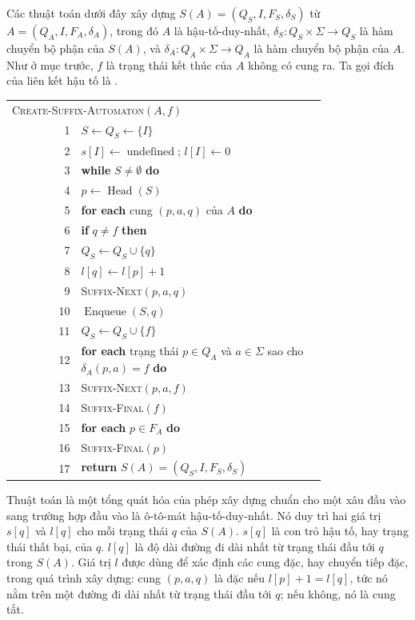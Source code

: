 \documentclass[11pt]{article}
\newcommand{\undefinedsym}{\operatorname{undefined}}
\begin{document}
Các thuật toán dưới đây xây dựng $S(A)=(Q_S,I,F_S,\delta_S)$ từ
$A=(Q_A,I,F_A,\delta_A)$, trong đó $A$ là hậu-tố-duy-nhất,
$\delta_S:Q_S\times\Sigma\to Q_S$ là hàm chuyển bộ phận của $S(A)$, và
$\delta_A:Q_A\times\Sigma\to Q_A$ là hàm chuyển bộ phận của $A$. Như ở mục
trước, $f$ là trạng thái kết thúc của $A$ không có cung ra. Ta gọi đích của
liên kết hậu tố là .

\begin{center}
\begin{tabular}{r p{0.78\linewidth}}
\multicolumn{2}{l}{\textsc{Create-Suffix-Automaton}$(A,f)$}\\
1 & $S\leftarrow Q_S\leftarrow\{I\}$ \\
2 & $s[I]\leftarrow\undefinedsym$; $l[I]\leftarrow 0$\\
3 & \textbf{while} $S\ne\emptyset$ \textbf{do}\\
4 & \quad $p\leftarrow \operatorname{Head}(S)$\\
5 & \quad \textbf{for each} cung $(p,a,q)$ của $A$ \textbf{do}\\
6 & \quad\quad \textbf{if} $q\ne f$ \textbf{then}\\
7 & \quad\quad\quad $Q_S\leftarrow Q_S\cup\{q\}$\\
8 & \quad\quad\quad $l[q]\leftarrow l[p]+1$\\
9 & \quad\quad\quad \textsc{Suffix-Next}$(p,a,q)$\\
10 & \quad\quad\quad $\operatorname{Enqueue}(S,q)$\\
11 & $Q_S\leftarrow Q_S\cup\{f\}$\\
12 & \textbf{for each} trạng thái $p\in Q_A$ và $a\in\Sigma$ sao cho
      $\delta_A(p,a)=f$ \textbf{do}\\
13 & \quad \textsc{Suffix-Next}$(p,a,f)$\\
14 & \quad \textsc{Suffix-Final}$(f)$\\
15 & \textbf{for each} $p\in F_A$ \textbf{do}\\
16 & \quad \textsc{Suffix-Final}$(p)$\\
17 & \textbf{return} $S(A)=(Q_S,I,F_S,\delta_S)$
\end{tabular}
\end{center}

Thuật toán là một tổng quát hóa của phép xây dựng chuẩn cho một xâu đầu vào
sang trường hợp đầu vào là ô-tô-mát hậu-tố-duy-nhất. Nó duy trì hai giá trị
$s[q]$ và $l[q]$ cho mỗi trạng thái $q$ của $S(A)$. $s[q]$ là con trỏ hậu tố,
hay trạng thái thất bại, của $q$. $l[q]$ là độ dài đường đi dài nhất từ trạng
thái đầu tới $q$ trong $S(A)$. Giá trị $l$ được dùng để xác định các cung đặc,
hay chuyển tiếp đặc, trong quá trình xây dựng: cung $(p,a,q)$ là đặc nếu
$l[p]+1=l[q]$, tức nó nằm trên một đường đi dài nhất từ trạng thái đầu tới
$q$; nếu không, nó là cung tắt.
\end{document}

